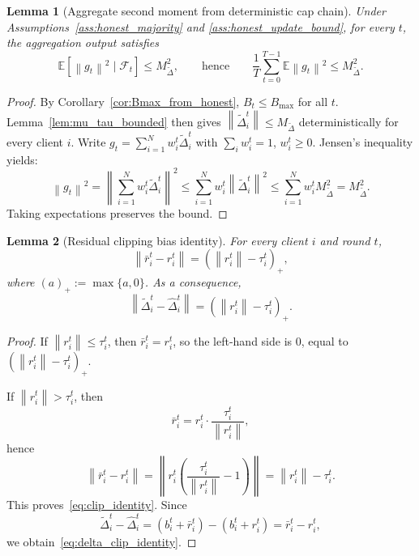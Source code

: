 \documentclass[11pt,a4paper]{article}
\newtheorem{lemma}{Lemma}
\theoremstyle{remark}
\newcommand{\E}{\mathbb{E}}
\newcommand{\F}{\mathcal{F}}
\newcommand{\norm}[1]{\left\lVert #1 \right\rVert}
\begin{document}
\begin{lemma}[Aggregate second moment from deterministic cap chain]
\label{lem:g_second_derived}
Under Assumptions~\ref{ass:honest_majority} and
\ref{ass:honest_update_bound}, for every \(t\), the aggregation output satisfies
\begin{equation}
    \E\!\left[\norm{g_t}^2 \mid \F_t\right]
    \le
    M_{\tilde\Delta}^2,
    \qquad\text{hence}\qquad
    \frac{1}{T}\sum_{t=0}^{T-1}\E\norm{g_t}^2 \le M_{\tilde\Delta}^2.
    \label{eq:Gg_derived}
\end{equation}
\end{lemma}

\begin{proof}
By Corollary~\ref{cor:Bmax_from_honest}, \(B_t\le B_{\max}\) for all \(t\). 
Lemma~\ref{lem:mu_tau_bounded} then gives \(\norm{\tilde\Delta_i^t}\le M_{\tilde\Delta}\) deterministically for every client \(i\). 
Write \(g_t=\sum_{i=1}^N w_i^t \tilde{\Delta}_i^t\) with \(\sum_i w_i^t=1\),
\(w_i^t\ge 0\). Jensen's inequality yields:
\[
    \norm{g_t}^2 = \norm{\sum_{i=1}^N w_i^t \tilde{\Delta}_i^t}^2
    \le
    \sum_{i=1}^N w_i^t \norm{\tilde{\Delta}_i^t}^2
    \le 
    \sum_{i=1}^N w_i^t M_{\tilde\Delta}^2 = M_{\tilde\Delta}^2.
\]
Taking expectations preserves the bound.
\end{proof}

\begin{lemma}[Residual clipping bias identity]
\label{lem:clip_identity}
For every client \(i\) and round \(t\),
\begin{equation}
    \norm{\bar{r}_i^t - r_i^t}
    =
    (\norm{r_i^t} - \tau_i^t)_+,
    \label{eq:clip_identity}
\end{equation}
where \((a)_+ := \max\{a,0\}\).
As a consequence,
\begin{equation}
    \norm{\tilde{\Delta}_i^t - \hat{\Delta}_i^t}
    =
    (\norm{r_i^t} - \tau_i^t)_+.
    \label{eq:delta_clip_identity}
\end{equation}
\end{lemma}

\begin{proof}
If \(\norm{r_i^t} \le \tau_i^t\), then \(\bar{r}_i^t = r_i^t\), so the
left-hand side is \(0\), equal to
\((\norm{r_i^t}-\tau_i^t)_+\).

If \(\norm{r_i^t} > \tau_i^t\), then
\[
    \bar{r}_i^t = r_i^t \cdot \frac{\tau_i^t}{\norm{r_i^t}},
\]
hence
\[
    \norm{\bar{r}_i^t - r_i^t}
    =
    \left\|
        r_i^t\left(\frac{\tau_i^t}{\norm{r_i^t}} - 1\right)
    \right\|
    =
    \norm{r_i^t} - \tau_i^t.
\]
This proves~\eqref{eq:clip_identity}.
Since
\[
    \tilde{\Delta}_i^t - \hat{\Delta}_i^t
    =
    (b_i^t+\bar{r}_i^t) - (b_i^t+r_i^t)
    =
    \bar{r}_i^t-r_i^t,
\]
we obtain~\eqref{eq:delta_clip_identity}.
\end{proof}
\end{document}
